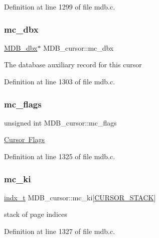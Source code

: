 Definition at line 1299 of file mdb.\+c.

\mbox{\label{struct_m_d_b__cursor_ae47065c198fe591153cbcb6211e4b049}} 
\subsubsection{\texorpdfstring{mc\+\_\+dbx}{mc\_dbx}}
{\footnotesize\ttfamily \mbox{\hyperlink{struct_m_d_b__dbx}{M\+D\+B\+\_\+dbx}}$\ast$ M\+D\+B\+\_\+cursor\+::mc\+\_\+dbx}

The database auxiliary record for this cursor 

Definition at line 1303 of file mdb.\+c.

\mbox{\label{struct_m_d_b__cursor_a9af6c760c16043b451b8592f8d1690c0}} 
\subsubsection{\texorpdfstring{mc\+\_\+flags}{mc\_flags}}
{\footnotesize\ttfamily unsigned int M\+D\+B\+\_\+cursor\+::mc\+\_\+flags}

\mbox{\hyperlink{group__mdb__cursor}{Cursor Flags}} 

Definition at line 1325 of file mdb.\+c.

\mbox{\label{struct_m_d_b__cursor_a8f1d553e9b663b477ad2f2e0c2483cea}} 
\subsubsection{\texorpdfstring{mc\+\_\+ki}{mc\_ki}}
{\footnotesize\ttfamily \mbox{\hyperlink{group__internal_ga730e17f748208d77496ebd895c8375dc}{indx\+\_\+t}} M\+D\+B\+\_\+cursor\+::mc\+\_\+ki\mbox{[}\mbox{\hyperlink{group__internal_gaef453f149efb721c2eb311a6ede48dc8}{C\+U\+R\+S\+O\+R\+\_\+\+S\+T\+A\+CK}}\mbox{]}}

stack of page indices 

Definition at line 1327 of file mdb.\+c.

